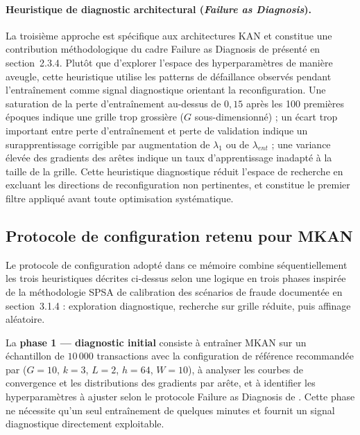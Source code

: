 \documentclass[11pt,a4paper,oneside]{report}
\theoremstyle{definition}
\theoremstyle{remark}
\begin{document}
\paragraph{Heuristique de diagnostic architectural (\textit{Failure as Diagnosis}).}
La troisième approche est spécifique aux architectures KAN et constitue une contribution méthodologique du cadre \og Failure as Diagnosis \fg{} de \citet{hou2024critical} présenté en section~2.3.4. Plutôt que d'explorer l'espace des hyperparamètres de manière aveugle, cette heuristique utilise les patterns de défaillance observés pendant l'entraînement comme signal diagnostique orientant la reconfiguration. Une saturation de la perte d'entraînement au-dessus de $0{,}15$ après les 100 premières époques indique une grille trop grossière ($G$ sous-dimensionné) ; un écart trop important entre perte d'entraînement et perte de validation indique un surapprentissage corrigible par augmentation de $\lambda_1$ ou de $\lambda_{ent}$ ; une variance élevée des gradients des arêtes indique un taux d'apprentissage inadapté à la taille de la grille. Cette heuristique diagnostique réduit l'espace de recherche en excluant les directions de reconfiguration non pertinentes, et constitue le premier filtre appliqué avant toute optimisation systématique.

\subsection{Protocole de configuration retenu pour MKAN}

Le protocole de configuration adopté dans ce mémoire combine séquentiellement les trois heuristiques décrites ci-dessus selon une logique en trois phases inspirée de la méthodologie SPSA de calibration des scénarios de fraude documentée en section~3.1.4 \citep{spall1992spsa} : exploration diagnostique, recherche sur grille réduite, puis affinage aléatoire.

La \textbf{phase 1 --- diagnostic initial} consiste à entraîner MKAN sur un échantillon de $10\,000$ transactions avec la configuration de référence recommandée par \citet{liu2024kan} ($G = 10$, $k = 3$, $L = 2$, $h = 64$, $W = 10$), à analyser les courbes de convergence et les distributions des gradients par arête, et à identifier les hyperparamètres à ajuster selon le protocole \og Failure as Diagnosis \fg{} de \citet{hou2024critical}. Cette phase ne nécessite qu'un seul entraînement de quelques minutes et fournit un signal diagnostique directement exploitable.
\end{document}
